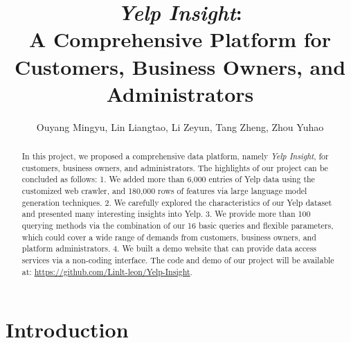 \documentclass[runningheads]{llncs}
\begin{document}
\pagestyle{headings}
\mainmatter



\author{Ouyang Mingyu, Lin Liangtao, Li Zeyun, Tang Zheng, Zhou Yuhao}




\title{\textit{Yelp Insight}: \\A Comprehensive Platform for Customers, Business Owners, and Administrators} %

\maketitle


\begin{abstract}
In this project, we proposed a comprehensive data platform, namely \textit{Yelp Insight}, for customers, business owners, and administrators. The highlights of our project can be concluded as follows: 1. We added more than 6,000 entries of Yelp data using the customized web crawler, and 180,000 rows of features via large language model generation techniques. 2. We carefully explored the characteristics of our Yelp dataset and presented many interesting insights into Yelp. 3. We provide more than 100 querying methods via the combination of our 16 basic queries and flexible parameters, which could cover a wide range of demands from customers, business owners, and platform administrators. 4. We built a demo website that can provide data access services via a non-coding interface. The code and demo of our project will be available at: \url{https://github.com/Linlt-leon/Yelp-Insight}.
\end{abstract}



\setcounter{tocdepth}{3}

\begin{spacing}{1.3}
\tableofcontents
\end{spacing}

\newpage  %



\section{Introduction}
\end{document}
